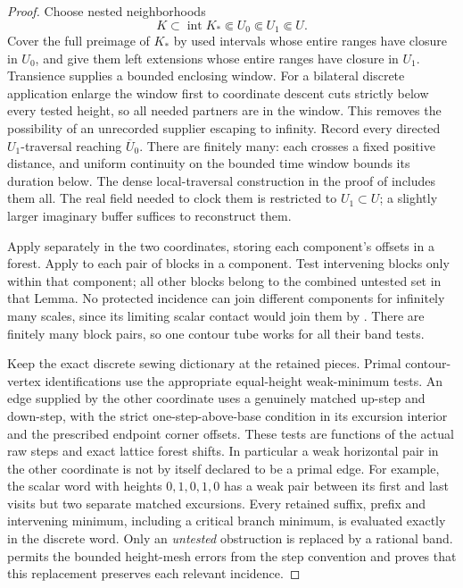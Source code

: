 \begin{proof}
Choose nested neighborhoods
\[
 K\subset\operatorname{int}K_*\Subset U_0\Subset U_1\Subset U.
\]
Cover the full preimage of \(K_*\) by used intervals whose entire ranges have closure in \(U_0\), and give them left extensions whose entire ranges have closure in \(U_1\). Transience supplies a bounded enclosing window. For a bilateral discrete application enlarge the window first to coordinate descent cuts strictly below every tested height, so all needed partners are in the window. This removes the possibility of an unrecorded supplier escaping to infinity. Record every directed \(U_1\)-traversal reaching \(\overline U_0\). There are finitely many: each crosses a fixed positive distance, and uniform continuity on the bounded time window bounds its duration below. The dense local-traversal construction in the proof of \cite[Lemma~2.4]{GwynneMillerSheffieldHarmonic} includes them all. The real field needed to clock them is restricted to \(U_1\subset U\); a slightly larger imaginary buffer suffices to reconstruct them.

Apply  separately in the two coordinates, storing each component's offsets in a forest. Apply  to each pair of blocks in a component. Test intervening blocks only within that component; all other blocks belong to the combined untested set in that Lemma. No protected incidence can join different components for infinitely many scales, since its limiting scalar contact would join them by . There are finitely many block pairs, so one contour tube works for all their band tests.

Keep the exact discrete sewing dictionary at the retained pieces. Primal contour-vertex identifications use the appropriate equal-height weak-minimum tests. An edge supplied by the other coordinate uses a genuinely matched up-step and down-step, with the strict one-step-above-base condition in its excursion interior and the prescribed endpoint corner offsets. These tests are functions of the actual raw steps and exact lattice forest shifts. In particular a weak horizontal pair in the other coordinate is not by itself declared to be a primal edge. For example, the scalar word with heights \(0,1,0,1,0\) has a weak pair between its first and last visits but two separate matched excursions. Every retained suffix, prefix and intervening minimum, including a critical branch minimum, is evaluated exactly in the discrete word. Only an \emph{untested} obstruction is replaced by a rational band.  permits the bounded height-mesh errors from the step convention and proves that this replacement preserves each relevant incidence.


\end{proof}
